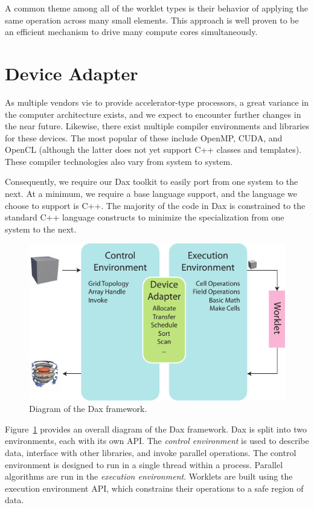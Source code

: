 \documentclass[conference]{IEEEtran}
\newcommand*{\keyterm}[1]{\emph{#1}}
\begin{document}
A common theme among all of the worklet types is their behavior of applying
the same operation across many small elements.  This approach is well
proven to be an efficient mechanism to drive many compute cores
simultaneously.

\section{Device Adapter}
\label{sec:DeviceAdapter}

\noindent
As multiple vendors vie to provide accelerator-type processors, a great
variance in the computer architecture exists, and we expect to encounter
further changes in the near future.  Likewise, there exist multiple
compiler environments and libraries for these devices.  The most popular of
these include OpenMP, CUDA, and OpenCL (although the latter does not yet
support C++ classes and templates).  These compiler technologies also vary
from system to system.

Consequently, we require our Dax toolkit to easily port from one system to
the next.  At a minimum, we require a base language support, and the
language we choose to support is C++.  The majority of the code in Dax is
constrained to the standard C++ language constructs to minimize the
specialization from one system to the next.

\begin{figure}[htb]
  \centering
  \includegraphics[width=\linewidth]{images/DaxDiagram}
  \caption{Diagram of the Dax framework.}
  \label{fig:DaxDiagram}
\end{figure}

Figure~\ref{fig:DaxDiagram} provides an overall diagram of the Dax
framework.  Dax is split into two environments, each with its own API.  The
\keyterm{control environment} is used to describe data, interface with
other libraries, and invoke parallel operations.  The control environment
is designed to run in a single thread within a process.  Parallel
algorithms are run in the \keyterm{execution environment}.  Worklets are
built using the execution environment API, which constrains their
operations to a safe region of data.
\end{document}
